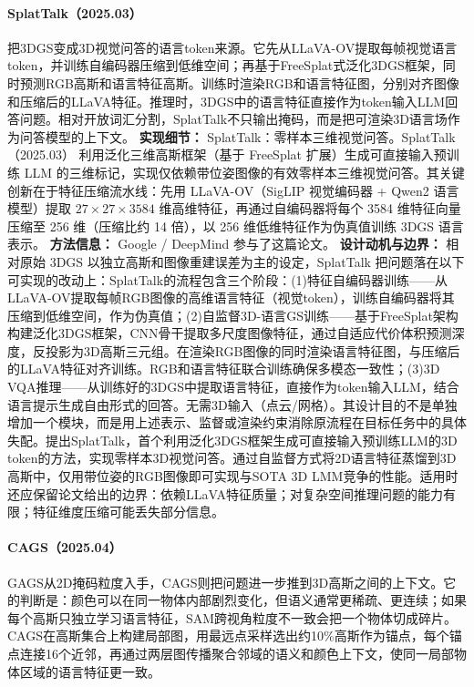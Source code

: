 \paragraph{SplatTalk（2025.03）\cite{2503_06271}}
把3DGS变成3D视觉问答的语言token来源。它先从LLaVA-OV提取每帧视觉语言token，并训练自编码器压缩到低维空间；再基于FreeSplat式泛化3DGS框架，同时预测RGB高斯和语言特征高斯。训练时渲染RGB和语言特征图，分别对齐图像和压缩后的LLaVA特征。推理时，3DGS中的语言特征直接作为token输入LLM回答问题。相对开放词汇分割，SplatTalk不只输出掩码，而是把可渲染3D语言场作为问答模型的上下文。
\textbf{实现细节：} SplatTalk：零样本三维视觉问答。SplatTalk（2025.03） 利用泛化三维高斯框架（基于 FreeSplat 扩展）生成可直接输入预训练 LLM 的三维标记，实现仅依赖带位姿图像的有效零样本三维视觉问答。其关键创新在于特征压缩流水线：先用 LLaVA-OV（SigLIP 视觉编码器 + Qwen2 语言模型）提取 $27 \times 27 \times 3584$ 维高维特征，再通过自编码器将每个 3584 维特征向量压缩至 256 维（压缩比约 14 倍），以 256 维低维特征作为伪真值训练 3DGS 语言表示。
\textbf{方法信息：} Google / DeepMind 参与了这篇论文。
\textbf{设计动机与边界：} 相对原始 3DGS 以独立高斯和图像重建误差为主的设定，SplatTalk 把问题落在以下可实现的改动上：SplatTalk的流程包含三个阶段：(1)特征自编码器训练——从LLaVA-OV提取每帧RGB图像的高维语言特征（视觉token），训练自编码器将其压缩到低维空间，作为伪真值；(2)自监督3D-语言GS训练——基于FreeSplat架构构建泛化3DGS框架，CNN骨干提取多尺度图像特征，通过自适应代价体积预测深度，反投影为3D高斯三元组。在渲染RGB图像的同时渲染语言特征图，与压缩后的LLaVA特征对齐训练。RGB和语言特征联合训练确保多模态一致性；(3)3D VQA推理——从训练好的3DGS中提取语言特征，直接作为token输入LLM，结合语言提示生成自由形式的回答。无需3D输入（点云/网格）。其设计目的不是单独增加一个模块，而是用上述表示、监督或渲染约束消除原流程在目标任务中的具体失配。提出SplatTalk，首个利用泛化3DGS框架生成可直接输入预训练LLM的3D token的方法，实现零样本3D视觉问答。通过自监督方式将2D语言特征蒸馏到3D高斯中，仅用带位姿的RGB图像即可实现与SOTA 3D LMM竞争的性能。适用时还应保留论文给出的边界：依赖LLaVA特征质量；对复杂空间推理问题的能力有限；特征维度压缩可能丢失部分信息。
\paragraph{CAGS（2025.04）\cite{2504_11893}}
GAGS从2D掩码粒度入手，CAGS则把问题进一步推到3D高斯之间的上下文。它的判断是：颜色可以在同一物体内部剧烈变化，但语义通常更稀疏、更连续；如果每个高斯只独立学习语言特征，SAM跨视角粒度不一致会把一个物体切成碎片。CAGS在高斯集合上构建局部图，用最远点采样选出约10\%高斯作为锚点，每个锚点连接16个近邻，再通过两层图传播聚合邻域的语义和颜色上下文，使同一局部物体区域的语言特征更一致。

